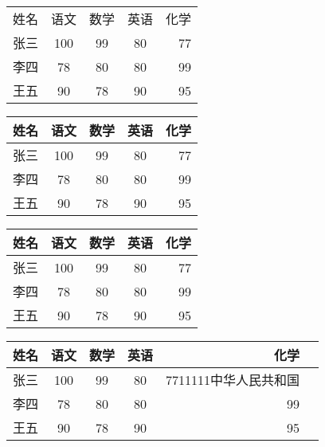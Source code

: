 \documentclass{ctexart}
\begin{document}
	\begin{tabular}{l|c|c|c|r|} %
		姓名 & 语文 & 数学 & 英语 & 化学 \\
		张三 & 100 & 99 & 80 & 77 \\
		李四 & 78 & 80 & 80 & 99 \\
		王五 & 90 & 78 & 90 & 95 \\
	\end{tabular}

	\begin{tabular}{l|c|c|c|r|} %
		\hline %
		姓名 & 语文 & 数学 & 英语 & 化学 \\
		\hline \hline
		张三 & 100 & 99 & 80 & 77 \\
		\hline
		李四 & 78 & 80 & 80 & 99 \\
		\hline
		王五 & 90 & 78 & 90 & 95 \\
		\hline
	\end{tabular}

	\begin{tabular}{|l||c|c|c|r|} %
		\hline %
		姓名 & 语文 & 数学 & 英语 & 化学 \\
		\hline \hline
		张三 & 100 & 99 & 80 & 77 \\
		\hline
		李四 & 78 & 80 & 80 & 99 \\
		\hline
		王五 & 90 & 78 & 90 & 95 \\
		\hline
	\end{tabular}

	\begin{tabular}{|l||c|c|c|r|p{2cm}|} %
		\hline %
		姓名 & 语文 & 数学 & 英语 & 化学 \\
		\hline \hline
		张三 & 100 & 99 & 80 & 7711111中华人民共和国 \\
		\hline
		李四 & 78 & 80 & 80 & 99 \\
		\hline
		王五 & 90 & 78 & 90 & 95 \\
		\hline
	\end{tabular}
\end{document}
